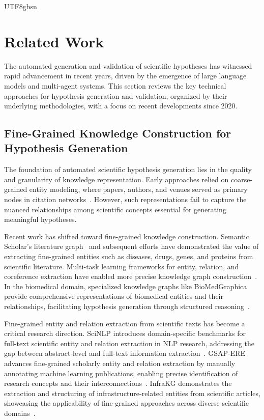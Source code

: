 \documentclass[11pt]{article}
\begin{document}
\begin{CJK}{UTF8}{gbsn}
\section{Related Work}

The automated generation and validation of scientific hypotheses has witnessed rapid advancement in recent years, driven by the emergence of large language models and multi-agent systems. This section reviews the key technical approaches for hypothesis generation and validation, organized by their underlying methodologies, with a focus on recent developments since 2020.

\subsection{Fine-Grained Knowledge Construction for Hypothesis Generation}

The foundation of automated scientific hypothesis generation lies in the quality and granularity of knowledge representation. Early approaches relied on coarse-grained entity modeling, where papers, authors, and venues served as primary nodes in citation networks~\cite{wang2020microsoft}. However, such representations fail to capture the nuanced relationships among scientific concepts essential for generating meaningful hypotheses.

Recent work has shifted toward fine-grained knowledge construction. Semantic Scholar's literature graph~\cite{ammar2018construction} and subsequent efforts have demonstrated the value of extracting fine-grained entities such as diseases, drugs, genes, and proteins from scientific literature. Multi-task learning frameworks for entity, relation, and coreference extraction have enabled more precise knowledge graph construction~\cite{luan2018multi}. In the biomedical domain, specialized knowledge graphs like BioMedGraphica provide comprehensive representations of biomedical entities and their relationships, facilitating hypothesis generation through structured reasoning~\cite{zhang2025biomedgraphica}.

Fine-grained entity and relation extraction from scientific texts has become a critical research direction. SciNLP introduces domain-specific benchmarks for full-text scientific entity and relation extraction in NLP research, addressing the gap between abstract-level and full-text information extraction~\cite{duan2025scinlp}. GSAP-ERE advances fine-grained scholarly entity and relation extraction by manually annotating machine learning publications, enabling precise identification of research concepts and their interconnections~\cite{otto2025gsap}. InfraKG demonstrates the extraction and structuring of infrastructure-related entities from scientific articles, showcasing the applicability of fine-grained approaches across diverse scientific domains~\cite{anjum2025infrakg}.


\end{CJK}
\end{document}
